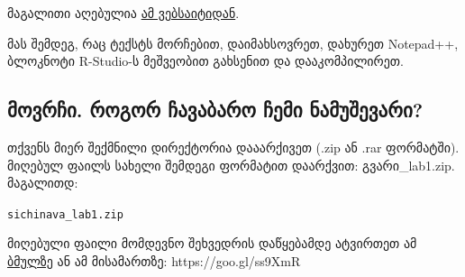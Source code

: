 \documentclass{article}\usepackage[]{graphicx}\usepackage[]{color}
\makeatletter
\newcommand{\hlstd}[1]{\textcolor[rgb]{0.345,0.345,0.345}{#1}}%
\newenvironment{kframe}{%
 \def\at@end@of@kframe{}%
 \ifinner\ifhmode%
  \def\at@end@of@kframe{\end{minipage}}%
  \begin{minipage}{\columnwidth}%
 \fi\fi%
 \def\FrameCommand##1{\hskip\@totalleftmargin \hskip-\fboxsep
 \colorbox{shadecolor}{##1}\hskip-\fboxsep
     \hskip-\linewidth \hskip-\@totalleftmargin \hskip\columnwidth}%
 \MakeFramed {\advance\hsize-\width
   \@totalleftmargin\z@ \linewidth\hsize
   \@setminipage}}%
 {\par\unskip\endMakeFramed%
 \at@end@of@kframe}
\newenvironment{knitrout}{}{} %
\makeatother
\begin{document}
მაგალითი აღებულია \href{http://guides.library.cornell.edu/annotatedbibliography}{ამ ვებსაიტიდან}.

მას შემდეგ, რაც ტექსტს მორჩებით, დაიმახსოვრეთ, დახურეთ Notepad++, ბლოკნოტი R-Studio-ს მეშვეობით გახსენით და დააკომპილირეთ.

\subsection*{მოვრჩი. როგორ ჩავაბარო ჩემი ნამუშევარი?}

თქვენს მიერ შექმნილი დირექტორია დააარქივეთ (.zip ან .rar ფორმატში). მიღებულ ფაილს სახელი შემდეგი ფორმატით დაარქვით: გვარი\_lab1.zip. მაგალითდ:
\begin{knitrout}
\color{fgcolor}\begin{kframe}
\begin{alltt}
\hlstd{sichinava_lab1.zip}
\end{alltt}
\end{kframe}
\end{knitrout}

მიღებული ფაილი მომდევნო შეხვედრის დაწყებამდე ატვირთეთ ამ \href{https://www.dropbox.com/request/oUc9abSj2pWwLHgObGV7}{ბმულზე} ან ამ მისამართზე: https://goo.gl/ss9XmR
\end{document}
